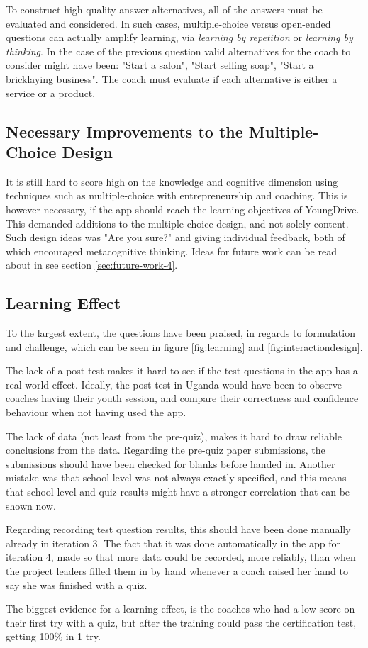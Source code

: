   To construct high-quality answer alternatives, all of the answers must be evaluated and considered. In such cases, multiple-choice versus open-ended questions can actually amplify learning, via \textit{learning by repetition} or \textit{learning by thinking}. In the case of the previous question valid alternatives for the coach to consider might have been: "Start a salon", "Start selling soap", "Start a bricklaying business". The coach must evaluate if each alternative is either a service or a product.

  \subsection{Necessary Improvements to the Multiple-Choice Design}
  It is still hard to score high on the knowledge and cognitive dimension using techniques such as multiple-choice with entrepreneurship and coaching. This is however necessary, if the app should reach the learning objectives of YoungDrive. This demanded additions to the multiple-choice design, and not solely content. Such design ideas was "Are you sure?" and giving individual feedback, both of which encouraged metacognitive thinking. Ideas for future work can be read about in see section \ref{sec:future-work-4}.

  \subsection{Learning Effect}
  To the largest extent, the questions have been praised, in regards to formulation and challenge, which can be seen in figure \ref{fig:learning} and \ref{fig:interactiondesign}.

  The lack of a post-test makes it hard to see if the test questions in the app has a real-world effect. Ideally, the post-test in Uganda would have been to observe coaches having their youth session, and compare their correctness and confidence behaviour when not having used the app. %

  The lack of data (not least from the pre-quiz), makes it hard to draw reliable conclusions from the data. Regarding the pre-quiz paper submissions, the submissions should have been checked for blanks before handed in. Another mistake was that school level was not always exactly specified, and this means that school level and quiz results might have a stronger correlation that can be shown now.

  Regarding recording test question results, this should have been done manually already in iteration 3. The fact that it was done automatically in the app for iteration 4, made so that more data could be recorded, more reliably, than when the project leaders filled them in by hand whenever a coach raised her hand to say she was finished with a quiz.

  The biggest evidence for a learning effect, is the coaches who had a low score on their first try with a quiz, but after the training could pass the certification test, getting 100\% in 1 try. 
